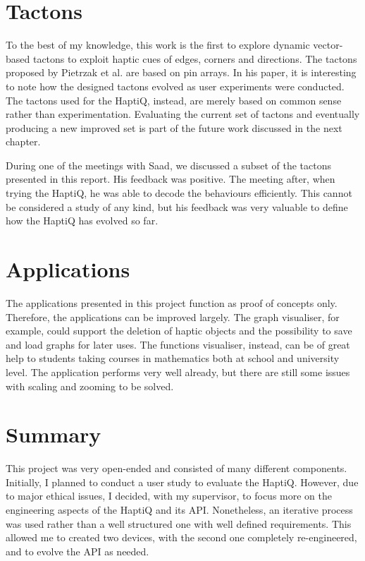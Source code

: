 
\section{Tactons}

To the best of my knowledge, this work is the first to explore dynamic vector-based tactons to exploit haptic cues of edges, corners and directions. The tactons proposed by Pietrzak et al. \cite{pietrzak2009creating} are based on pin arrays. In his paper, it is interesting to note how the designed tactons evolved as user experiments were conducted. The tactons used for the HaptiQ, instead, are merely based on common sense rather than experimentation. Evaluating the current set of tactons and eventually producing a new improved set is part of the future work discussed in the next chapter.

During one of the meetings with Saad, we discussed a subset of the tactons presented in this report. His feedback was positive. The meeting after, when trying the HaptiQ, he was able to decode the behaviours efficiently. This cannot be considered a study of any kind, but his feedback was very valuable to define how the HaptiQ has evolved so far. 

\section{Applications}

The applications presented in this project function as proof of concepts only. Therefore, the applications can be improved largely. The graph visualiser, for example, could support the deletion of haptic objects and the possibility to save and load graphs for later uses. The functions visualiser, instead, can be of great help to students taking courses in mathematics both at school and university level. The application performs very well already, but there are still some issues with scaling and zooming to be solved. 

\section{Summary}

This project was very open-ended and consisted of many different components. Initially, I planned to conduct a user study to evaluate the HaptiQ. However, due to major ethical issues, I decided, with my supervisor, to focus more on the engineering aspects of the HaptiQ and its API. Nonetheless, an iterative process was used rather than a well structured one with well defined requirements. This allowed me to created two devices, with the second one completely re-engineered, and to evolve the API as needed.    


